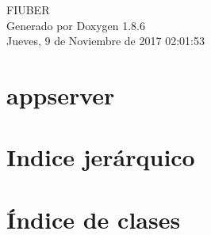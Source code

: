 \documentclass[twoside]{book}
\newcommand{\clearemptydoublepage}{%
  \newpage{\pagestyle{empty}\cleardoublepage}%
}
\begin{document}
\hypersetup{pageanchor=false}
\begin{titlepage}
\vspace*{7cm}
\begin{center}%
{\Large F\-I\-U\-B\-E\-R }\\
\vspace*{1cm}
{\large Generado por Doxygen 1.8.6}\\
\vspace*{0.5cm}
{\small Jueves, 9 de Noviembre de 2017 02:01:53}\\
\end{center}
\end{titlepage}
\clearemptydoublepage
\tableofcontents
\clearemptydoublepage
{}
\hypersetup{pageanchor=true}

\chapter{appserver}
\label{md__r_e_a_d_m_e}
\hypertarget{md__r_e_a_d_m_e}{}

\chapter{Indice jerárquico}

\chapter{Índice de clases}

\end{document}
